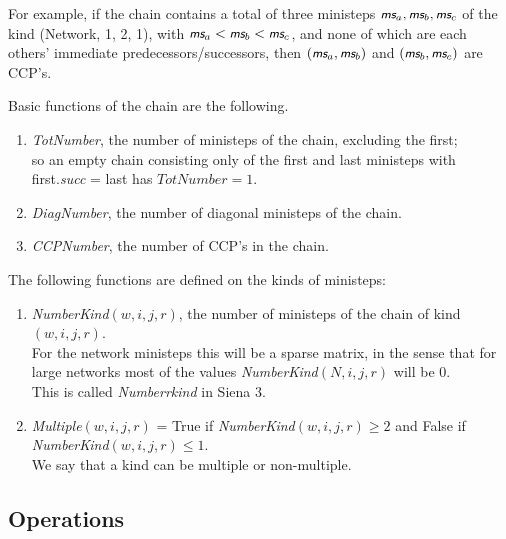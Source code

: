 \documentclass[a4paper,fleqn,12pt]{article}
\newcommand{\ms}{\textsl{\textsf{\small ms}}} %
\begin{document}
For example, if the chain contains a total of three ministeps
$\ms_a, \ms_b, \ms_c$
of the kind (Network, 1, 2, 1), with $\ms_a < \ms_b < \ms_c$,
and none of which are each others' immediate predecessors/successors,
then $(\ms_a, \ms_b)$ and $(\ms_b, \ms_c)$ are CCP's.

Basic functions of the chain are the following.
\begin{enumerate}
\item \textit{TotNumber}, the number of ministeps of the chain, excluding the first;\\
      so an empty chain consisting only of the first and last ministeps
      with \\
      first.\textit{succ} = last has $TotNumber = 1$.
\item \textit{DiagNumber}, the number of diagonal ministeps of the chain.
\item\textit{CCPNumber}, the number of CCP's in the chain.
\end{enumerate}

The following functions are defined on the kinds of ministeps:
\begin{enumerate}
\item \textit{NumberKind}$(w,i,j,r)$, the number of ministeps of the chain
      of kind $(w,i,j,r)$.\\
      For the network ministeps this will be a sparse matrix, in the sense that for large networks
      most of the values \textit{NumberKind}$(N,i,j,r)$ will be 0.\\
      This is called \textit{Numberrkind} in Siena 3.
\item \textit{Multiple}$(w,i,j,r)$ = True if \textit{NumberKind}$(w,i,j,r) \geq 2$
      and False if \textit{NumberKind}$(w,i,j,r) \leq 1$.\\
      We say that a kind can be multiple or non-multiple.
\end{enumerate}

\subsection{Operations}
\end{document}
